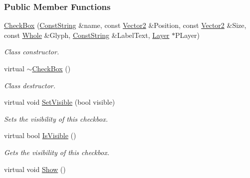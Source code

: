 \subsubsection*{Public Member Functions}
\begin{DoxyCompactItemize}
\item 
\hyperlink{classphys_1_1UI_1_1CheckBox_a0e14bcd4b2588ef7b5f07db0add19454}{CheckBox} (\hyperlink{namespacephys_a5ce5049f8b4bf88d6413c47b504ebb31}{ConstString} \&name, const \hyperlink{classphys_1_1Vector2}{Vector2} \&Position, const \hyperlink{classphys_1_1Vector2}{Vector2} \&Size, const \hyperlink{namespacephys_a460f6bc24c8dd347b05e0366ae34f34a}{Whole} \&Glyph, \hyperlink{namespacephys_a5ce5049f8b4bf88d6413c47b504ebb31}{ConstString} \&LabelText, \hyperlink{classphys_1_1UI_1_1Layer}{Layer} $\ast$PLayer)
\begin{DoxyCompactList}\small\item\em Class constructor. \item\end{DoxyCompactList}\item 
\hypertarget{classphys_1_1UI_1_1CheckBox_a60c4d62c357a7158d69888a367b5dc56}{
virtual \hyperlink{classphys_1_1UI_1_1CheckBox_a60c4d62c357a7158d69888a367b5dc56}{$\sim$CheckBox} ()}
\label{dd/d10/classphys_1_1UI_1_1CheckBox_a60c4d62c357a7158d69888a367b5dc56}

\begin{DoxyCompactList}\small\item\em Class destructor. \item\end{DoxyCompactList}\item 
virtual void \hyperlink{classphys_1_1UI_1_1CheckBox_aac2babdb951a7b716b5cfff9b925420f}{SetVisible} (bool visible)
\begin{DoxyCompactList}\small\item\em Sets the visibility of this checkbox. \item\end{DoxyCompactList}\item 
virtual bool \hyperlink{classphys_1_1UI_1_1CheckBox_a8a2be0cba227f0921071fb14de24f76d}{IsVisible} ()
\begin{DoxyCompactList}\small\item\em Gets the visibility of this checkbox. \item\end{DoxyCompactList}\item 
\hypertarget{classphys_1_1UI_1_1CheckBox_afceb8a1afac295be23227462e6cbc369}{
virtual void \hyperlink{classphys_1_1UI_1_1CheckBox_afceb8a1afac295be23227462e6cbc369}{Show} ()}
\label{dd/d10/classphys_1_1UI_1_1CheckBox_afceb8a1afac295be23227462e6cbc369}


\end{DoxyCompactItemize}

